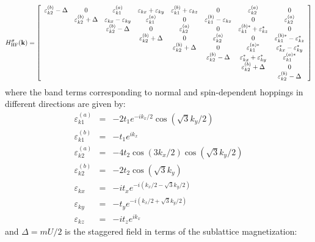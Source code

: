 \documentclass[aps,prb,fleqn,12pt,amsmath,amssymb]{revtex4}
\begin{document}
{\small
\begin{equation}
H_{\rm HF} ^\sigma (\bf k) = \left [ 
\begin{array}{cccccccc}
\varepsilon_{k2}^{(b)} - \Delta & 0 & \varepsilon_{k1}^{(a)} &\varepsilon_{kx} + \varepsilon_{ky} & \varepsilon_{k1}^{(b)} + \varepsilon_{kz} & 0 & \varepsilon_{k2}^{(a)} & 0 \\
  & \varepsilon_{k2}^{(b)} + \Delta & \varepsilon_{kx} - \varepsilon_{ky} & \varepsilon_{k1}^{(a)} & 0 & \varepsilon_{k1}^{(b)} - \varepsilon_{kz} & 0 & \varepsilon_{k2}^{(a)} \\
  &  & \varepsilon_{k2}^{(b)} - \Delta & 0 & \varepsilon_{k2}^{(a)} & 0 & \varepsilon_{k1}^{(b)*} + \varepsilon_{kz}^* & 0 \\
  &  &  & \varepsilon_{k2}^{(b)} + \Delta & 0 & \varepsilon_{k2}^{(a)} & 0 & \varepsilon_{k1}^{(b)*} - \varepsilon_{kz}^* \\
  &  &  &  & \varepsilon_{k2}^{(b)} + \Delta & 0 & \varepsilon_{k1}^{(a)*} & \varepsilon_{kx}^* - \varepsilon_{ky}^*  \\ 
  &  &  &  &  & \varepsilon_{k2}^{(b)} - \Delta & \varepsilon_{kx}^* + \varepsilon_{ky}^* & \varepsilon_{k1}^{(a)*} \\ 
  &  &  &  &  &  & \varepsilon_{k2}^{(b)} + \Delta & 0 \\ 
  &  &  &  &  &  &  & \varepsilon_{k2}^{(b)} - \Delta \\ 
\end{array} \right ]
\label{hf_hamiltonian}
\end{equation} 
}
where the band terms corresponding to normal and spin-dependent hoppings in different directions are given by:
\begin{eqnarray}
\varepsilon_{k1}^{(a)} & = & -2t_1 e^{-i k_x/2} \cos (\sqrt{3}k_y/2) \nonumber \\
\varepsilon_{k1}^{(b)} & = & -t_1 e^{i k_x} \nonumber \\
\varepsilon_{k2}^{(a)} & = & -4t_2 \cos (3 k_x/2) \cos (\sqrt{3} k_y/2) \nonumber \\
\varepsilon_{k2}^{(b)} & = & -2t_2 \cos (\sqrt{3}k_y) \nonumber \\
\varepsilon_{kx} & = & -it_x e^{-i (k_x /2 - \sqrt{3} k_y/2)} \nonumber \\
\varepsilon_{ky} & = & -t_y e^{-i (k_x /2 + \sqrt{3} k_y/2)} \nonumber \\
\varepsilon_{kz} & = & -it_z e^{i k_x}
\end{eqnarray}
and $\Delta = mU/2$ is the staggered field in terms of the sublattice magnetization:
\end{document}
